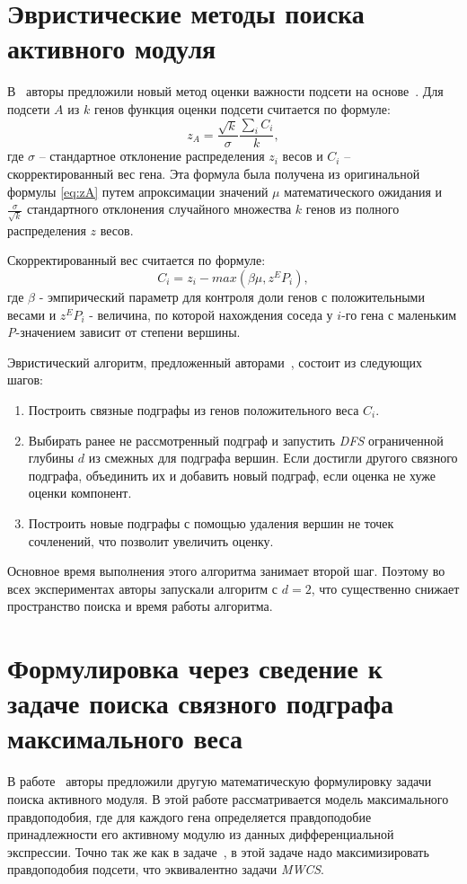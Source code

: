 \section{Эвристические методы поиска активного модуля}

В~\cite{Rajagopalan2005} авторы предложили новый метод оценки важности подсети
на основе~\cite{Ideker2002}.  Для подсети $A$ из $k$ генов функция оценки
подсети считается по формуле:
\[z_A = \frac{\sqrt{k}}{\sigma} \frac{\sum_{i}{C_i}}{k},\]
где $\sigma$ -- стандартное отклонение распределения $z_i$ весов и $C_i$
-- скорректированный вес гена.  Эта формула была получена из оригинальной
формулы \eqref{eq:zA} путем апроксимации значений $\mu$ математического
ожидания и $\frac{\sigma}{\sqrt{k}}$ стандартного отклонения случайного
множества $k$ генов из полного распределения $z$ весов.

Скорректированный вес считается по формуле:
\[C_i = z_i - max(\beta \mu, z^EP_i),\]
где $\beta$ - эмпирический параметр для контроля доли генов с положительными
весами и $z^EP_i$ - величина, по которой нахождения соседа у $i$-го гена
с маленьким \emph{P}-значением зависит от степени вершины.

Эвристический алгоритм, предложенный авторами~\cite{Rajagopalan2005}, состоит из
следующих шагов:
\begin{enumerate}
    \item Построить связные подграфы из генов положительного веса $C_i.$
    \item Выбирать ранее не рассмотренный подграф и запустить \emph{DFS}
        ограниченной глубины $d$ из смежных для подграфа вершин. Если
        достигли другого связного подграфа, объединить их и добавить новый
        подграф, если оценка не хуже оценки компонент.
    \item Построить новые подграфы с помощью удаления вершин не точек
        сочленений, что позволит увеличить оценку.
\end{enumerate}

Основное время выполнения этого алгоритма занимает второй шаг. Поэтому во всех
экспериментах авторы запускали алгоритм с $d=2$, что существенно снижает
пространство поиска и время работы алгоритма.





\section{Формулировка через сведение к задаче поиска связного подграфа
максимального веса}
В работе~\cite{Dittrich2008a,Beisser2010} авторы предложили другую
математическую формулировку задачи поиска активного модуля.  В этой работе
рассматривается модель максимального правдоподобия, где для каждого гена
определяется правдоподобие принадлежности его активному модулю из данных
дифференциальной экспрессии.  Точно так же как в задаче~\cite{Ideker2002},
в этой задаче надо максимизировать правдоподобия подсети, что эквивалентно
задачи \emph{MWCS}.

